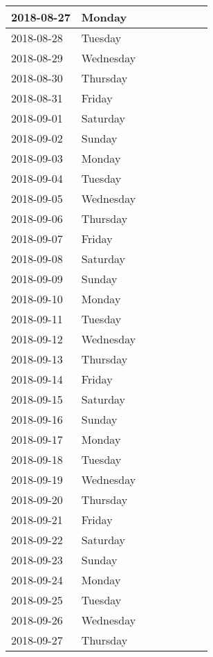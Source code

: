 \documentclass[10pt,a4paper]{article}
\begin{document}
\begin{longtable}{| p{} p{} | p{} | p{} | p{} | p{} | p{} | p{} |}
2018-08-27	&Monday		& & & & & &\\ \hline
2018-08-28	&Tuesday	& & & & & &\\ \hline
2018-08-29	&Wednesday	& & & & & &\\ \hline
2018-08-30	&Thursday	& & & & & &\\ \hline
2018-08-31	&Friday		& & & & & &\\ \hline
2018-09-01	&Saturday	& & & & & &\\ \hline
2018-09-02	&Sunday		& & & & & &\\ \hline
2018-09-03	&Monday		& & & & & &\\ \hline
2018-09-04	&Tuesday	& & & & & &\\ \hline
2018-09-05	&Wednesday	& & & & & &\\ \hline
2018-09-06	&Thursday	& & & & & &\\ \hline
2018-09-07	&Friday		& & & & & &\\ \hline
2018-09-08	&Saturday	& & & & & &\\ \hline
2018-09-09	&Sunday		& & & & & &\\ \hline
2018-09-10	&Monday		& & & & & &\\ \hline
2018-09-11	&Tuesday	& & & & & &\\ \hline
2018-09-12	&Wednesday	& & & & & &\\ \hline
2018-09-13	&Thursday	& & & & & &\\ \hline
2018-09-14	&Friday		& & & & & &\\ \hline
2018-09-15	&Saturday	& & & & & &\\ \hline
2018-09-16	&Sunday		& & & & & &\\ \hline
2018-09-17	&Monday		& & & & & &\\ \hline
2018-09-18	&Tuesday	& & & & & &\\ \hline
2018-09-19	&Wednesday	& & & & & &\\ \hline
2018-09-20	&Thursday	& & & & & &\\ \hline
2018-09-21	&Friday		& & & & & &\\ \hline
2018-09-22	&Saturday	& & & & & &\\ \hline
2018-09-23	&Sunday		& & & & & &\\ \hline
2018-09-24	&Monday		& & & & & &\\ \hline
2018-09-25	&Tuesday	& & & & & &\\ \hline
2018-09-26	&Wednesday	& & & & & &\\ \hline
2018-09-27	&Thursday	& & & & & &\\ \hline

\end{longtable}
\end{document}
